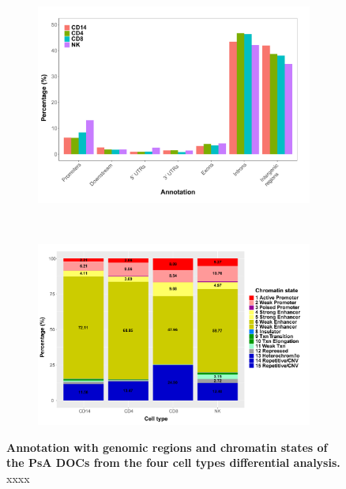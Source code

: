 \bigskip
\begin{figure}[H]
\centering
\begin{subfigure}[b]{0.5\textwidth}
\centering 
\includegraphics[width=\textwidth]{./Results3/pdfs/ATAC_PSA_DOCS_per_cell_type_general_annotation}
\caption{}
\end{subfigure}
~
\begin{subfigure}[b]{0.6\textwidth} 
\centering
\includegraphics[width=\textwidth]{./Results3/pdfs/ATAC_PSA_DOCS_chromatin_states_stacked_barplot}
\caption{}
\end{subfigure}
\caption[Annotation with genomic regions and chromatin states of the PsA DOCs from the four cell types differential analysis.]{\textbf{Annotation with genomic regions and chromatin states of the PsA DOCs from the four cell types differential analysis.} xxxx}
\label{figure:PsA_FAST_ATAC_DOCS_annotation}
\end{figure}


